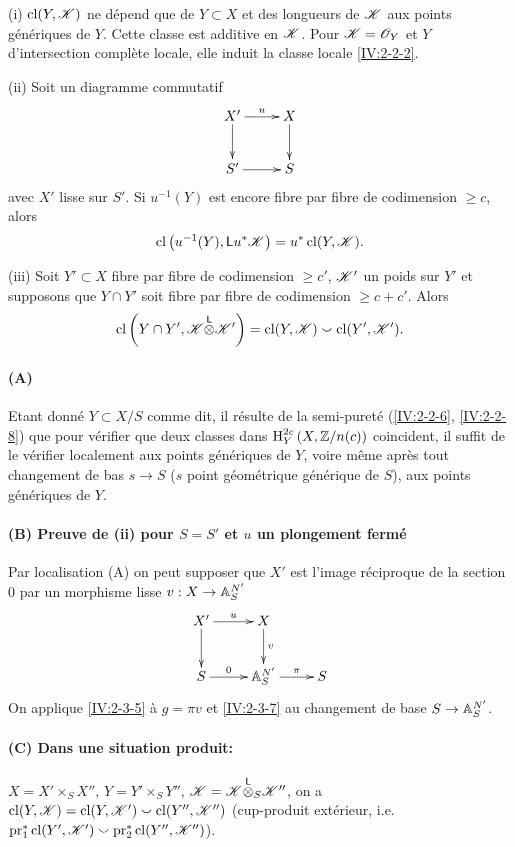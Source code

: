 \begin{theorem}\label{IV:2-3-8}
(i) $\operatorname{cl}(Y,\mathscr{K})$ ne d\'epend que de $Y\subset X$ et des longueurs de $\mathscr{K}$ aux 
points g\'en\'eriques de $Y$. Cette classe est additive en $\mathscr{K}$. Pour 
$\mathscr{K}=\mathscr{O}_Y$ et $Y$ d'intersection compl\`ete locale, elle induit la classe 
locale \ref{IV:2-2-2}.

(ii) Soit un diagramme commutatif 
\[\xymatrix{
  X' \ar[r]^-u \ar[d] 
    & X \ar[d] \\
  S' \ar[r] 
    & S
}\]
avec $X'$ lisse sur $S'$. Si $u^{-1}(Y)$ est encore fibre par fibre de 
codimension $\geqslant c$, alors 
\[
  \operatorname{cl}\left(u^{-1}(Y),\mathsf{L} u^\ast\mathscr{K}\right) = u^\ast \operatorname{cl}(Y,\mathscr{K}) \text{.}
\]

(iii) Soit $Y'\subset X$ fibre par fibre de codimension $\geqslant c'$, 
$\mathscr{K}'$ un poids sur $Y'$ et supposons que $Y\cap Y'$ soit fibre par fibre de 
codimension $\geqslant c+c'$. Alors 
\[
\operatorname{cl}\left(Y\cap Y',\mathscr{K}{\overset{\mathsf{L}}{\otimes}} \mathscr{K}'\right) = \operatorname{cl}(Y,\mathscr{K}) \smallsmile \operatorname{cl}(Y',\mathscr{K}') \text{.}
\]
\end{theorem}



\paragraph{(A)}
Etant donn\'e $Y\subset X/S$ comme dit, il r\'esulte de la semi-puret\'e 
(\ref{IV:2-2-6}, \ref{IV:2-2-8}) que pour v\'erifier que deux classes dans 
$\operatorname{H}_Y^{2 c}\left(X,\mathbb{Z}/n(c)\right)$ coincident, il suffit de le v\'erifier 
localement aux points g\'en\'eriques de $Y$, voire m\^eme apr\`es tout 
changement de bas $s\to S$ ($s$ point g\'eom\'etrique g\'en\'erique de $S$), 
aux points g\'en\'eriques de $Y$. 

\paragraph{(B) Preuve de (ii) pour $S=S'$ et $u$ un plongement ferm\'e}
Par localisation (A) on peut supposer que $X'$ est l'image 
r\'eciproque de la section $0$ par un morphisme lisse $v:X\to \mathbb{A}_S^{N'}$ 
\[\xymatrix{
  X' \ar[r]^-u \ar[d] 
    & X \ar[d]^-v \\
  S \ar[r]^-0 
    & \dA_S^{N'} \ar[r]^-\pi 
    & S
}\]
On applique \ref{IV:2-3-5} \`a $g=\pi v$ et \ref{IV:2-3-7} au changement de 
base $S\to \mathbb{A}_S^{N'}$. 

\paragraph{(C) Dans une situation produit:}
$X=X'\times_S X''$, $Y=Y'\times_S Y''$, $\mathscr{K}=\mathscr{K}{\overset{\mathsf{L}}{\otimes}}_S \mathscr{K}''$, on a 
$\operatorname{cl}(Y,\mathscr{K}) = \operatorname{cl}(Y,\mathscr{K}')\smallsmile \operatorname{cl}(Y'',\mathscr{K}'')$ (cup-produit ext\'erieur, 
i.e. $\operatorname{pr}_1^\ast \operatorname{cl}(Y',\mathscr{K}')\smallsmile \operatorname{pr}_2^\ast \operatorname{cl}(Y'',\mathscr{K}'')$). 

